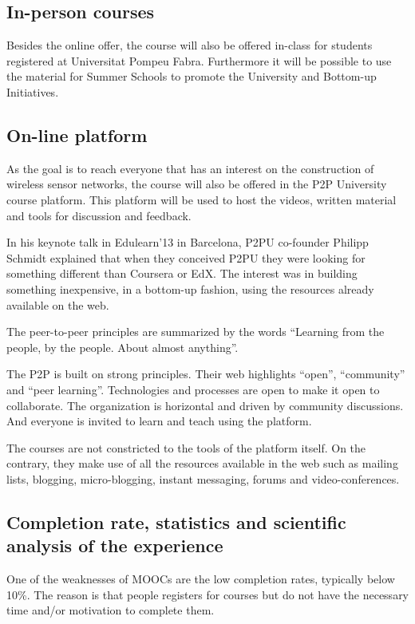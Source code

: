 \documentclass[a4paper,oneside]{book}   %
\begin{document}
\subsection{In-person courses}

Besides the online offer, the course will also be offered in-class for students registered at Universitat Pompeu Fabra.
Furthermore it will be possible to use the material for Summer Schools to promote the University and Bottom-up Initiatives.

\subsection{On-line platform}

As the goal is to reach everyone that has an interest on the construction of wireless sensor networks, the course will also be offered in the P2P University course platform.
This platform will be used to host the videos, written material and tools for discussion and feedback.

In his keynote talk in Edulearn'13 in Barcelona, P2PU co-founder Philipp Schmidt explained that when they conceived P2PU they were looking for something different than Coursera or EdX.
The interest was in building something inexpensive, in a bottom-up fashion, using the resources already available on the web.

The peer-to-peer principles are summarized by the words ``Learning from the people, by the people. About almost anything''.

The P2P is built on strong principles. 
Their web highlights ``open'', ``community'' and ``peer learning''.
Technologies and processes are open to make it open to collaborate.
The organization is horizontal and driven by community discussions.
And everyone is invited to learn and teach using the platform.

The courses are not constricted to the tools of the platform itself. 
On the contrary, they make use of all the resources available in the web such as mailing lists, blogging, micro-blogging, instant messaging, forums and video-conferences. 

\subsection{Completion rate, statistics and scientific analysis of the experience}

One of the weaknesses of MOOCs are the low completion rates, typically below 10\%.
The reason is that people registers for courses but do not have the necessary time and/or motivation to complete them.
\end{document}
